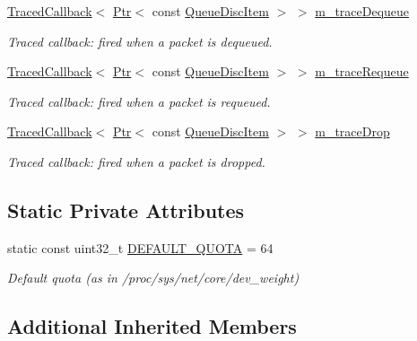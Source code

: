 \begin{DoxyCompactItemize}
\hyperlink{classns3_1_1TracedCallback}{Traced\+Callback}$<$ \hyperlink{classns3_1_1Ptr}{Ptr}$<$ const \hyperlink{classns3_1_1QueueDiscItem}{Queue\+Disc\+Item} $>$ $>$ \hyperlink{classns3_1_1QueueDisc_a1be3a308037b0feb28ae284b9be04bfc}{m\+\_\+trace\+Dequeue}
\begin{DoxyCompactList}\small\item\em Traced callback\+: fired when a packet is dequeued. \end{DoxyCompactList}\item 
\hyperlink{classns3_1_1TracedCallback}{Traced\+Callback}$<$ \hyperlink{classns3_1_1Ptr}{Ptr}$<$ const \hyperlink{classns3_1_1QueueDiscItem}{Queue\+Disc\+Item} $>$ $>$ \hyperlink{classns3_1_1QueueDisc_a599ba8331f01a8b7ff1d690a8c52dedc}{m\+\_\+trace\+Requeue}
\begin{DoxyCompactList}\small\item\em Traced callback\+: fired when a packet is requeued. \end{DoxyCompactList}\item 
\hyperlink{classns3_1_1TracedCallback}{Traced\+Callback}$<$ \hyperlink{classns3_1_1Ptr}{Ptr}$<$ const \hyperlink{classns3_1_1QueueDiscItem}{Queue\+Disc\+Item} $>$ $>$ \hyperlink{classns3_1_1QueueDisc_a4d59074e7f6aa601eee90f5cd87d423f}{m\+\_\+trace\+Drop}
\begin{DoxyCompactList}\small\item\em Traced callback\+: fired when a packet is dropped. \end{DoxyCompactList}\end{DoxyCompactItemize}
\subsection*{Static Private Attributes}
\begin{DoxyCompactItemize}
\item 
static const uint32\+\_\+t \hyperlink{classns3_1_1QueueDisc_a057a2c6dd982ffb206ce2a42eb4f46fa}{D\+E\+F\+A\+U\+L\+T\+\_\+\+Q\+U\+O\+TA} = 64
\begin{DoxyCompactList}\small\item\em Default quota (as in /proc/sys/net/core/dev\+\_\+weight) \end{DoxyCompactList}\end{DoxyCompactItemize}
\subsection*{Additional Inherited Members}


